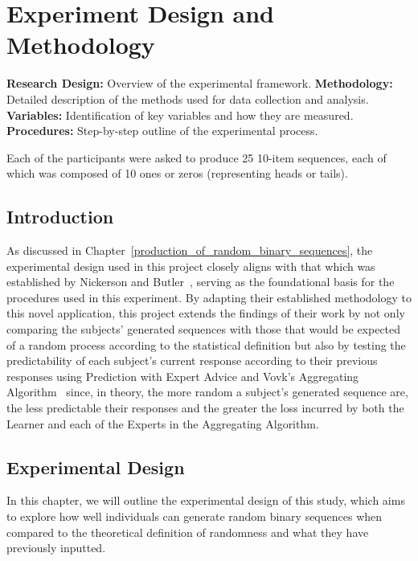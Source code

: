 \section{Experiment Design and Methodology}\label{section:Experiment_Design_and_Methodology}
\textbf{Research Design:} Overview of the experimental framework.\newline
\textbf{Methodology:} Detailed description of the methods used for data collection and analysis.\newline
\textbf{Variables:} Identification of key variables and how they are measured.\newline
\textbf{Procedures:} Step-by-step outline of the experimental process.\newline

Each of the participants were asked to produce 25 10-item sequences, each of which was composed of 10 ones or zeros (representing heads or tails).

\subsection{Introduction}
As discussed in Chapter~\ref{production_of_random_binary_sequences}, the experimental design used in this project closely aligns with that which was established by Nickerson and Butler~\cite{nickerson:2009}, serving as the foundational basis for the procedures used in this experiment. By adapting their established methodology to this novel application, this project extends the findings of their work by not only comparing the subjects' generated sequences with those that would be expected of a random process according to the statistical definition but also by testing the predictability of each subject's current response according to their previous responses using Prediction with Expert Advice and Vovk's Aggregating Algorithm~\cite{vovk:1990} since, in theory, the more random a subject's generated sequence are, the less predictable their responses and the greater the loss incurred by both the Learner and each of the Experts in the Aggregating Algorithm.

\subsection{Experimental Design}
In this chapter, we will outline the experimental design of this study, which aims to explore how well individuals can generate random binary sequences when compared to the theoretical definition of randomness and what they have previously inputted. 

